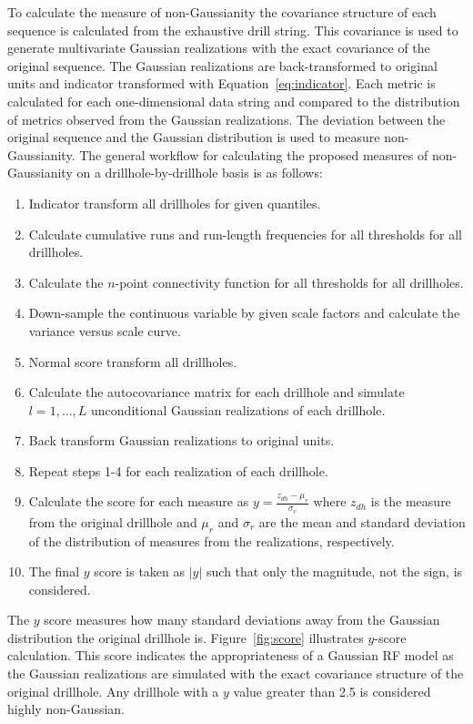 To calculate the measure of non-Gaussianity the covariance structure of each sequence is calculated from the exhaustive drill string. This covariance is used to generate multivariate Gaussian realizations with the exact covariance of the original sequence. The Gaussian realizations are back-transformed to original units and indicator transformed with Equation~\ref{eq:indicator}. Each metric is calculated for each one-dimensional data string and compared to the distribution of metrics observed from the Gaussian realizations. The deviation between the original sequence and the Gaussian distribution is used to measure non-Gaussianity. The general workflow for calculating the proposed measures of non-Gaussianity on a drillhole-by-drillhole basis is as follows:
\begin{enumerate}[noitemsep]
    \item Indicator transform all drillholes for given quantiles.
    \item Calculate cumulative runs and run-length frequencies for all thresholds for all drillholes.
    \item Calculate the $n$-point connectivity function for all thresholds for all drillholes.
    \item Down-sample the continuous variable by given scale factors and calculate the variance versus scale curve.
    \item Normal score transform all drillholes.
    \item Calculate the autocovariance matrix for each drillhole and simulate $l=1,\dots,L$ unconditional Gaussian realizations of each drillhole.
    \item Back transform Gaussian realizations to original units.
    \item Repeat steps 1-4 for each realization of each drillhole.
    \item Calculate the score for each measure as $y = \frac{z_{dh}-\mu_{r}}{\sigma_{r}}$ where $z_{dh}$ is the measure from the original drillhole and $\mu_{r}$ and $\sigma_{r}$ are the mean and standard deviation of the distribution of measures from the realizations, respectively.
    \item The final $y$ score is taken as $\lvert y \rvert$ such that only the magnitude, not the sign, is considered.
\end{enumerate}

The $y$ score measures how many standard deviations away from the Gaussian distribution the original drillhole is. Figure~\ref{fig:score} illustrates $y$-score calculation. This score indicates the appropriateness of a Gaussian \gls{RF} model as the Gaussian realizations are simulated with the exact covariance structure of the original drillhole. Any drillhole with a $y$ value greater than 2.5 is considered highly non-Gaussian.

